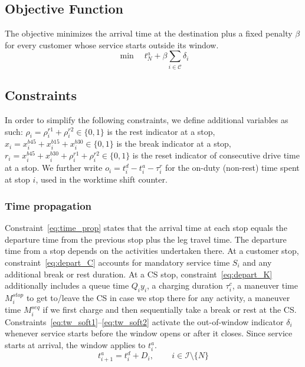 \documentclass[preprint,12pt,3p]{elsarticle}
\begin{document}
\subsection{Objective Function}
The objective minimizes the arrival time at the destination plus a fixed penalty $\beta$ for every customer whose service starts outside its window.
\begin{equation}
    \min \quad t_N^a + \beta \sum_{i \in \mathcal C}\delta_i
\end{equation}

\subsection{Constraints}
In order to simplify the following constraints, we define additional variables as such: $\rho_i = \rho_i^{r1} + \rho_i^{r2} \in \{0,1\}$ is the rest indicator at a stop, $x_i = x_i^{b45} + x_i^{b15} + x_i^{b30} \in \{0,1\}$ is the break indicator at a stop, $r_i = x_i^{b45} + x_i^{b30} + \rho_i^{r1} + \rho_i^{r2} \in \{0,1\}$ is the reset indicator of consecutive drive time at a stop. We further write $o_i=t^d_i - t^a_i - \tau_i^r $ for the on-duty (non-rest) time spent at stop $i$, used in the worktime shift counter.

\subsubsection{Time propagation}
Constraint~\eqref{eq:time_prop} states that the arrival time at each stop equals the departure time from the previous stop plus the leg travel time. The departure time from a stop depends on the activities undertaken there. At a customer stop, constraint~\eqref{eq:depart_C} accounts for mandatory service time $S_i$ and any additional break or rest duration. At a CS stop, constraint~\eqref{eq:depart_K} additionally includes a queue time $Q_i y_i$, a charging duration $\tau_i^c$, a maneuver time $M_i^{stop}$ to get to/leave the CS in case we stop there for any activity, a maneuver time $M_i^{seq}$ if we first charge and then sequentially take a break or rest at the CS. Constraints~\eqref{eq:tw_soft1}--\eqref{eq:tw_soft2} activate the out-of-window indicator $\delta_i$ whenever service starts before the window opens or after it closes. Since service starts at arrival, the window applies to $t_i^a$.
\begin{equation}
    t_{i+1}^a = t_i^d + D_i,
    \qquad \, i \in \mathcal{I}\setminus\{N\}
    \label{eq:time_prop}
\end{equation}
\end{document}
